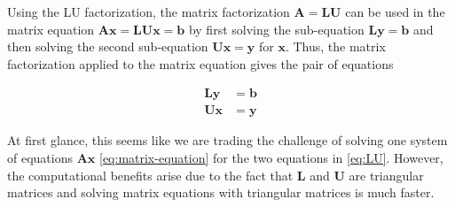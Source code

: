 \documentclass[
]{book}
\theoremstyle{definition}
\theoremstyle{definition}
\theoremstyle{definition}
\theoremstyle{definition}
\theoremstyle{remark}
\begin{document}
Using the LU factorization, the matrix factorization \(\mathbf{A} = \mathbf{L} \mathbf{U}\) can be used in the matrix equation \(\mathbf{A} \mathbf{x} = \mathbf{L} \mathbf{U}\mathbf{x} = \mathbf{b}\) by first solving the sub-equation \(\mathbf{L} \mathbf{y} = \mathbf{b}\) and then solving the second sub-equation \(\mathbf{U} \mathbf{x} = \mathbf{y}\) for \(\mathbf{x}\). Thus, the matrix factorization applied to the matrix equation gives the pair of equations

\[
\begin{aligned}
\mathbf{L} \mathbf{y} & = \mathbf{b} \\
\mathbf{U} \mathbf{x} & = \mathbf{y}
\end{aligned}
\label{eq:LU}
\]

At first glance, this seems like we are trading the challenge of solving one system of equations \(\mathbf{A}\mathbf{x}\) \eqref{eq:matrix-equation} for the two equations in \eqref{eq:LU}. However, the computational benefits arise due to the fact that \(\mathbf{L}\) and \(\mathbf{U}\) are triangular matrices and solving matrix equations with triangular matrices is much faster.
\end{document}
